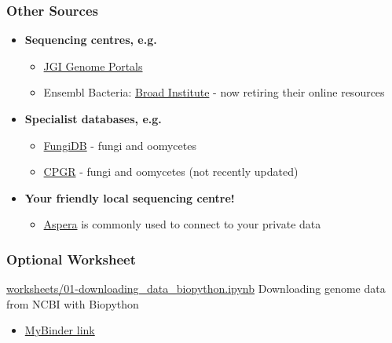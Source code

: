 \begin{frame}
  \frametitle{Other Sources}
    \begin{itemize}
      \item \textbf{Sequencing centres, e.g.}
      \begin{itemize}
        \item \textcolor{hutton_purple}{\href{http://genome.jgi.doe.gov/}{JGI Genome Portals}}
        \item Ensembl Bacteria: \textcolor{hutton_purple}{\href{https://www.broadinstitute.org/}{Broad Institute}} - now retiring their online resources
      \end{itemize}
      \item \textbf{Specialist databases, e.g.}
      \begin{itemize}
        \item \textcolor{hutton_purple}{\href{http://fungidb.org/fungidb/}{FungiDB}} - fungi and oomycetes
        \item \textcolor{hutton_purple}{\href{http://cpgr.plantbiology.msu.edu/}{CPGR}} - fungi and oomycetes (not recently updated)
      \end{itemize}
      \item \textbf{Your friendly local sequencing centre!}      
      \begin{itemize}
        \item \textcolor{hutton_purple}{\href{http://asperasoft.com/}{Aspera}} is commonly used to connect to your private data
      \end{itemize}
    \end{itemize}
\end{frame}

\begin{frame}
  \frametitle{Optional Worksheet}
  \begin{alertblock}{\url{worksheets/01-downloading_data_biopython.ipynb}}
    Downloading genome data from NCBI with Biopython
  \end{alertblock}
  \begin{itemize}
    \item \textcolor{hutton_purple}{\href{http://mybinder.org/repo/widdowquinn/Teaching-EMBL-Plant-Path-Genomics}{MyBinder link}}
  \end{itemize}
\end{frame}
